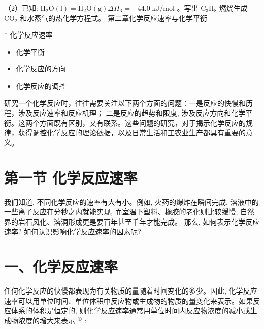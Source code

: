 \documentclass[10pt]{article}
\begin{document}
（2）已知: \({\mathrm{H}}_{2}\mathrm{O}\left( \mathrm{l}\right) = {\mathrm{H}}_{2}\mathrm{O}\left( \mathrm{g}\right) \Delta {H}_{3} = + {44.0}\mathrm{\;{kJ}}/\mathrm{{mol}}\) 。写出 \({\mathrm{C}}_{3}{\mathrm{H}}_{8}\) 燃烧生成 \({\mathrm{{CO}}}_{2}\) 和水蒸气的热化学方程式。 第二章化学反应速率与化学平衡

\begin{mdframed}

* 化学反应速率

\begin{itemize}
\item 化学平衡
\end{itemize}

\begin{itemize}
\item 化学反应的方向
\end{itemize}

\begin{itemize}
\item 化学反应的调控
\end{itemize}

\end{mdframed}

研究一个化学反应时，往往需要关注以下两个方面的问题：一是反应的快慢和历程，涉及反应速率和反应机理； 二是反应的趋势和限度, 涉及反应方向和化学平衡。这两个方面既有区别，又有联系。这些问题的研究，对于揭示化学反应的规律，获得调控化学反应的理论依据，以及日常生活和工农业生产都具有重要的意义。

\section*{第一节 化学反应速率}

我们知道, 不同化学反应的速率有大有小。例如, 火药的爆炸在瞬间完成, 溶液中的一些离子反应在分秒之内就能实现, 而室温下塑料、橡胶的老化则比较缓慢, 自然界的岩石风化、溶洞形成更是要百年甚至千年才能完成。 那么, 如何表示化学反应速率? 如何认识影响化学反应速率的因素呢?

\section*{一、化学反应速率}

任何化学反应的快慢都表现为有关物质的量随着时间变化的多少。因此, 化学反应速率可以用单位时间、单位体积中反应物或生成物的物质的量变化来表示。如果反应体系的体积是恒定的, 则化学反应速率通常用单位时间内反应物浓度的减小或生成物浓度的增大来表示 \({}^{\text{①}}\) :
\end{document}
